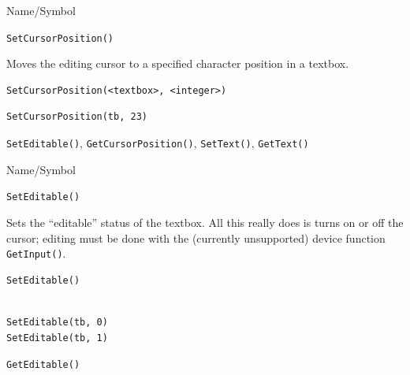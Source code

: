 \begin{desc}{Name/Symbol}
\item[Name/Symbol] 	\verb+SetCursorPosition()+

\item[Description] 	Moves the editing cursor to a specified character
		position in a textbox.

\item[Usage]
\begin{verbatim}
SetCursorPosition(<textbox>, <integer>)
\end{verbatim}

\item[Example]
\begin{verbatim}
SetCursorPosition(tb, 23)
\end{verbatim}

\item[See Also]   	\verb+SetEditable()+, \verb+GetCursorPosition()+, \verb+SetText()+, \verb+GetText()+
\end{desc}

\begin{desc}{Name/Symbol}
\item[Name/Symbol] 	\verb+SetEditable()+

\item[Description] Sets the ``editable'' status of the textbox.  All
  this really does is turns on or off the cursor; editing must be done
  with the (currently unsupported) device function \verb+GetInput()+.

\item[Usage] 
\begin{verbatim}
SetEditable()
\end{verbatim}

\item[Example]
\begin{verbatim}

SetEditable(tb, 0)
SetEditable(tb, 1)
\end{verbatim}

\item[See Also]    	\verb+GetEditable()+
\end{desc}

